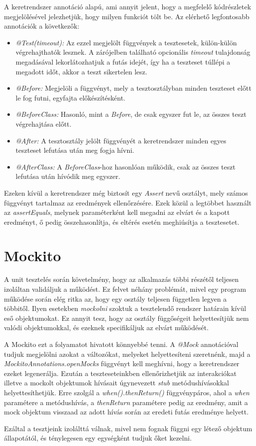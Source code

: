 A keretrendszer annotáció alapú, ami annyit jelent, hogy a megfelelő kódrészletek megjelölésével jelezhetjük, hogy milyen funkciót tölt be. Az elérhető legfontosabb annotációk a következők:
\begin{itemize}
	\item \emph{@Test(timeout):} Az ezzel megjelölt függvények a tesztesetek, külön-külön végrehajthatók lesznek. A zárójelben található opcionális \emph{timeout} tulajdonság megadásával lekorlátozhatjuk a futás idejét, így ha a teszteset túllépi a megadott időt, akkor a teszt sikertelen lesz.
	\item \emph{@Before:} Megjelöli a függvényt, mely a tesztosztályban minden teszteset előtt le fog futni, egyfajta előkészítésként.
	\item \emph{@BeforeClass:} Hasonló, mint a \emph{Before}, de csak egyszer fut le, az összes teszt végrehajtása előtt.
	\item \emph{@After:} A tesztosztály jelölt függvényét a keretrendszer minden egyes teszteset lefutása után meg fogja hívni.
	\item \emph{@AfterClass:} A \emph{BeforeClass}-hoz hasonlóan működik, csak az összes teszt lefutása után hívódik meg egyszer.
\end{itemize}

Ezeken kívül a keretrendszer még biztosít egy \emph{Assert} nevű osztályt, mely számos függvényt tartalmaz az eredmények ellenőrzésére. Ezek közül a legtöbbet használt az \emph{assertEquals}, melynek paraméterként kell megadni az elvárt és a kapott eredményt, ő pedig összehasonlítja, és eltérés esetén meghiúsítja a tesztesetet. \cite{JUnit}

\section{Mockito}

A unit tesztelés során követelmény, hogy az alkalmazás többi részétől teljesen izoláltan validáljuk a működést. Ez felvet néhány problémát, mivel egy program működése során elég ritka az, hogy egy osztály teljesen független legyen a többitől. Ilyen esetekben \emph{mockolni} szoktuk a tesztelendő rendszer határain kívül eső objektumokat. Ez annyit tesz, hogy az osztály függőségeit helyettesítjük nem valódi objektumokkal, és ezeknek specifikáljuk az elvárt működését.

A Mockito ezt a folyamatot hivatott könnyebbé tenni. A \emph{@Mock} annotációval tudjuk megjelölni azokat a változókat, melyeket helyettesíteni szeretnénk, majd a \emph{MockitoAnnotations.openMocks} függvényt kell meghívni, hogy a keretrendszer ezeket legenerálja. Ezután a teszteseteinkben ellenőrizhetjük az interakciókat illetve a mockolt objektumok hívásait úgynevezett \emph{stub} metódushívásokkal helyettesíthetjük. Erre szolgál a \emph{when().thenReturn()} függvénypáros, ahol a \emph{when} paramétere a metódushívás, a \emph{thenReturn} paramétere pedig az eredmény, amit a mock objektum visszaad az adott hívás során az eredeti futás eredménye helyett.

Ezáltal a tesztjeink izolálttá válnak, mivel nem fognak függni egy létező objektum állapotától, és ténylegesen egy egységként tudjuk őket kezelni.

